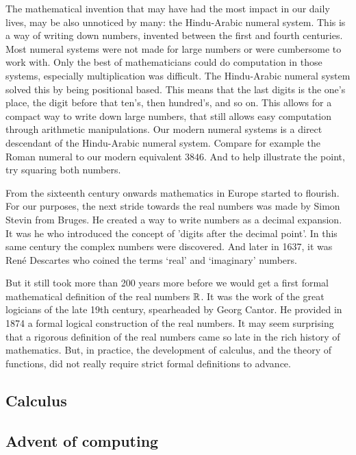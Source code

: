 The mathematical invention that may have had the most impact in our daily lives, may be also unnoticed by many: the Hindu-Arabic numeral system. This is a way of writing down numbers, invented between the first and fourth centuries. Most numeral systems were not made for large numbers or were cumbersome to work with. Only the best of mathematicians could do computation in those systems, especially multiplication was difficult. The Hindu-Arabic numeral system solved this by being positional based. This means that the last digits is the one's place, the digit before that ten's, then hundred's, and so on. This allows for a compact way to write down large numbers, that still allows easy computation through arithmetic manipulations. Our modern numeral systems is a direct descendant of the Hindu-Arabic numeral system. Compare for example the Roman numeral \uppercase\expandafter{\relax} to our modern equivalent $3846$. And to help illustrate the point, try squaring both numbers.

From the sixteenth century onwards mathematics in Europe started to flourish. For our purposes, the next stride towards the real numbers was made by Simon Stevin from Bruges. He created a way to write numbers as a decimal expansion. It was he who introduced the concept of 'digits after the decimal point'. In this same century the complex numbers were discovered. And later in 1637, it was René Descartes who coined the terms `real' and `imaginary' numbers.

But it still took more than 200 years more before we would get a first formal mathematical definition of the real numbers $\mathbb{R}$. It was the work of the great logicians of the late 19th century, spearheaded by Georg Cantor. He provided in 1874 a formal logical construction of the real numbers. It may seem surprising that a rigorous definition of the real numbers came so late in the rich history of mathematics. But, in practice, the development of calculus, and the theory of functions, did not really require strict formal definitions to advance.


\subsection{Calculus}




\subsection{Advent of computing}

